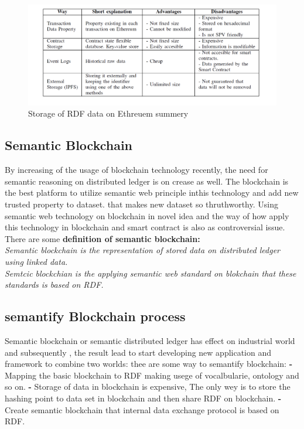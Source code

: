 \begin{center}
	\begin{figure}[htb!]
		
		\begin{minipage}{0.55\linewidth}
			\centering
			\includegraphics[width=1.95\textwidth]{images/chap02_Eth_Table.png}
		\end{minipage}
		\caption[Storage of RDF data on Ethreuem summery]{Storage of RDF data on Ethreuem summery}
		
	\end{figure}
	
\end{center}



\subsection{Semantic Blockchain}
	
By increasing of the usage of blockchain technology recently, the need for semantic reasoning on distributed ledger is on crease as well. The blockchain is the best platform to utilize semantic web principle inthis technology and add new trusted property to dataset. that makes new dataset so thruthworthy. 
Using semantic web technology on blockchain in novel idea and the way of how apply this technology in blockchain and smart contract is also as controversial issue.\\
There are some \textbf{definition of semantic blockchain:}\\ 
\textit{Semantic blockchain is the representation of stored data on distributed ledger using linked data. }\\
\textit{Semtcic blockchian is the applying semantic web standard on blokchain that these standards is based on RDF.}

\subsection{semantify Blockchain process}
Semantic blockchain or semantic distributed ledger has effect on industrial world and subsequently , the result lead to start developing new application and framework to combine two worlds:
thee are some way to semantify blockchain:
\textbf{-}Mapping the basic blockchain to RDF making usege of vocalbularie, ontology and so on.
\textbf{-} Storage of data in blockchain is expensive, The only wey is to store the hashing point to data set in blockchain and then share RDF on blockchain.
\textbf{-} Create semantic blockchain that internal data exchange protocol is based on RDF.

